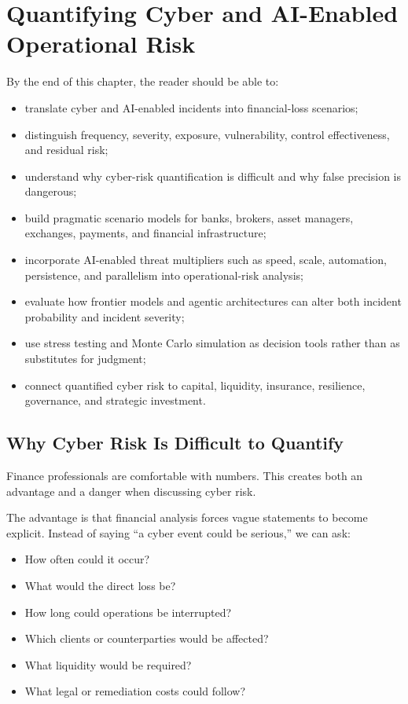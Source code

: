 \chapter{Quantifying Cyber and AI-Enabled Operational Risk}

\begin{learningobjectives}
By the end of this chapter, the reader should be able to:
\begin{itemize}
    \item translate cyber and AI-enabled incidents into financial-loss scenarios;
    \item distinguish frequency, severity, exposure, vulnerability, control effectiveness, and residual risk;
    \item understand why cyber-risk quantification is difficult and why false precision is dangerous;
    \item build pragmatic scenario models for banks, brokers, asset managers, exchanges, payments, and financial infrastructure;
    \item incorporate AI-enabled threat multipliers such as speed, scale, automation, persistence, and parallelism into operational-risk analysis;
    \item evaluate how frontier models and agentic architectures can alter both incident probability and incident severity;
    \item use stress testing and Monte Carlo simulation as decision tools rather than as substitutes for judgment;
    \item connect quantified cyber risk to capital, liquidity, insurance, resilience, governance, and strategic investment.
\end{itemize}
\end{learningobjectives}

\section{Why Cyber Risk Is Difficult to Quantify}

Finance professionals are comfortable with numbers. This creates both an advantage and a danger when discussing cyber risk.

The advantage is that financial analysis forces vague statements to become explicit. Instead of saying ``a cyber event could be serious,'' we can ask:

\begin{itemize}
    \item How often could it occur?
    \item What would the direct loss be?
    \item How long could operations be interrupted?
    \item Which clients or counterparties would be affected?
    \item What liquidity would be required?
    \item What legal or remediation costs could follow?
\end{itemize}

